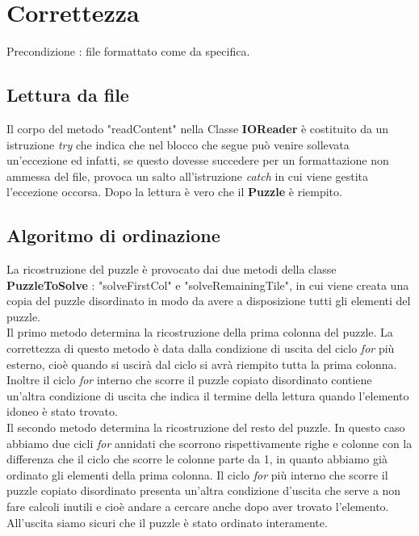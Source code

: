 \documentclass[11pt]{article}
\begin{document}
\section{Correttezza}
Precondizione : file formattato come da specifica.
\subsection{Lettura da file}
Il corpo del metodo "readContent" nella Classe \textbf{IOReader} è costituito da un istruzione \textit{try} che indica che nel blocco che segue può venire sollevata un'eccezione ed infatti, se questo dovesse succedere per un formattazione non ammessa del file, provoca un salto all'istruzione \textit{catch} in cui viene gestita l'eccezione occorsa. Dopo la lettura è vero che il \textbf{Puzzle} è riempito.
\subsection{Algoritmo di ordinazione}
La ricostruzione del puzzle è provocato dai due metodi della classe \textbf{PuzzleToSolve} : "solveFirstCol" e "solveRemainingTile", in cui viene creata una copia del puzzle disordinato in modo da avere a disposizione tutti gli elementi del puzzle.\\
Il primo metodo determina la ricostruzione della prima colonna del puzzle. La correttezza di questo metodo è data dalla condizione di uscita del ciclo \textit{for} più esterno, cioè quando si uscirà dal ciclo si avrà riempito tutta la prima colonna. Inoltre il ciclo \textit{for} interno che scorre il puzzle copiato disordinato contiene un'altra condizione di uscita che indica il termine della lettura quando l'elemento idoneo è stato trovato.\\
Il secondo metodo determina la ricostruzione del resto del puzzle. In questo caso abbiamo due cicli \textit{for}  annidati che scorrono rispettivamente righe e colonne con la differenza che il ciclo che scorre le colonne parte da 1, in quanto abbiamo già ordinato gli elementi della prima colonna. Il ciclo \textit{for} più interno che scorre il puzzle copiato disordinato presenta un'altra condizione d'uscita che serve a non fare calcoli inutili e cioè andare a cercare anche dopo aver trovato l'elemento.\\
All'uscita siamo sicuri che il puzzle è stato ordinato interamente.
\end{document}
